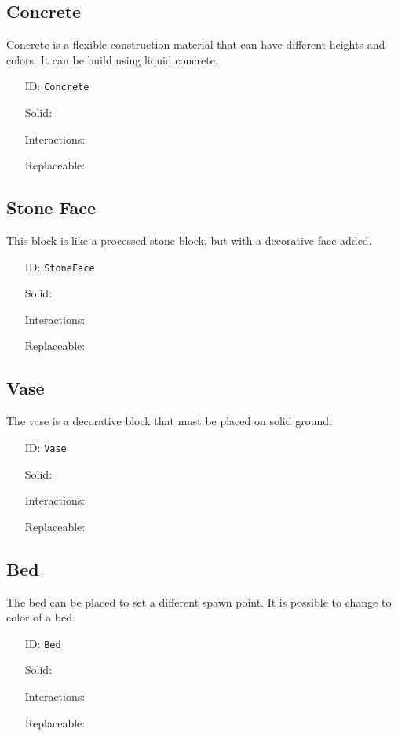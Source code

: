 \subsection{Concrete}\label{subsec:blocks_concrete}
Concrete is a flexible construction material that can have different heights and colors.
It can be build using liquid concrete.
\newline
\begin{itemize}[nosep]
    \item[ID:] \texttt{Concrete}
    \item[Solid:]  \Checkmark \item[Interactions:]  \Checkmark \item[Replaceable:]  \XSolidBrush
\end{itemize}

\subsection{Stone Face}\label{subsec:blocks_stone face}
This block is like a processed stone block, but with a decorative face added.
\newline
\begin{itemize}[nosep]
    \item[ID:] \texttt{StoneFace}
    \item[Solid:]  \Checkmark \item[Interactions:]  \XSolidBrush \item[Replaceable:]  \XSolidBrush
\end{itemize}

\subsection{Vase}\label{subsec:blocks_vase}
The vase is a decorative block that must be placed on solid ground.
\newline
\begin{itemize}[nosep]
    \item[ID:] \texttt{Vase}
    \item[Solid:]  \Checkmark \item[Interactions:]  \XSolidBrush \item[Replaceable:]  \XSolidBrush
\end{itemize}

\subsection{Bed}\label{subsec:blocks_bed}
The bed can be placed to set a different spawn point.
It is possible to change to color of a bed.
\newline
\begin{itemize}[nosep]
    \item[ID:] \texttt{Bed}
    \item[Solid:]  \Checkmark \item[Interactions:]  \Checkmark \item[Replaceable:]  \XSolidBrush
\end{itemize}

